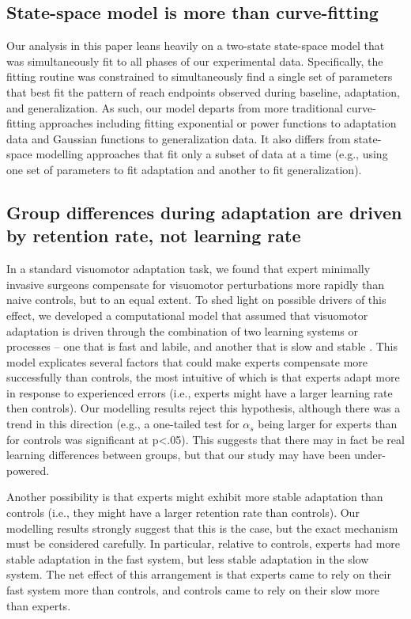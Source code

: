 \documentclass[man, 11pt, longtable, floatsintext, notab]{apa6}
\begin{document}
\subsection{State-space model is more than curve-fitting}
Our analysis in this paper leans heavily on a two-state
state-space model that was simultaneously fit to all phases
of our experimental data. Specifically, the fitting routine
was constrained to simultaneously find a single set of
parameters that best fit the pattern of reach endpoints
observed during baseline, adaptation, and generalization. As
such, our model departs from more traditional curve-fitting
approaches including fitting exponential or power functions
to adaptation data and Gaussian functions to generalization
data. It also differs from state-space modelling approaches
that fit only a subset of data at a time (e.g., using one
set of parameters to fit adaptation and another to fit
generalization).

\subsection{Group differences during adaptation are driven
  by retention rate, not learning rate}
In a standard visuomotor adaptation task, we found that
expert minimally invasive surgeons compensate for visuomotor
perturbations more rapidly than naive controls, but to an
equal extent. To shed light on possible drivers of this
effect, we developed a computational model that assumed that
visuomotor adaptation is driven through the combination of
two learning systems or processes -- one that is fast and
labile, and another that is slow and stable
\cite{smith_interacting_2006}. This model explicates several
factors that could make experts compensate more successfully
than controls, the most intuitive of which is that experts
adapt more in response to experienced errors (i.e., experts
might have a larger learning rate then controls). Our
modelling results reject this hypothesis, although there was
a trend in this direction (e.g., a one-tailed test for
$\alpha_s$ being larger for experts than for controls was
significant at p<.05). This suggests that there may in fact
be real learning differences between groups, but that our
study may have been under-powered.

Another possibility is that experts might exhibit more stable
adaptation than controls (i.e., they might have a larger
retention rate than controls). Our modelling results
strongly suggest that this is the case, but the exact
mechanism must be considered carefully. In particular,
relative to controls, experts had more stable adaptation in
the fast system, but less stable adaptation in the slow
system. The net effect of this arrangement is that experts
came to rely on their fast system more than controls, and
controls came to rely on their slow more than experts.
\end{document}
